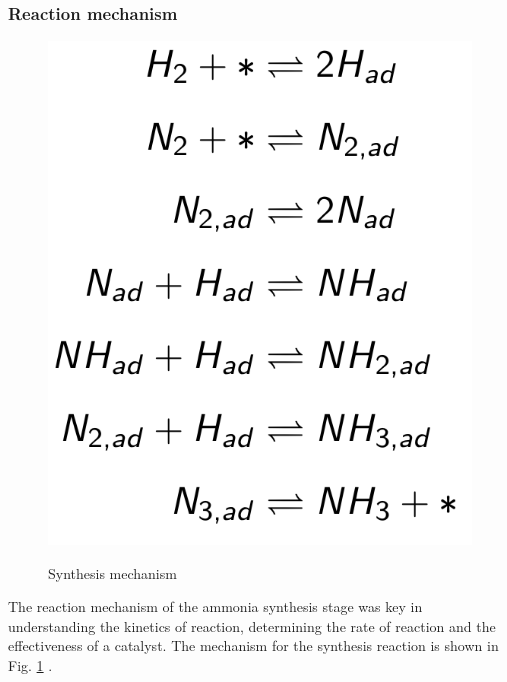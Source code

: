 \documentclass[11pt, a4paper]{article}
\begin{document}
{\subsubsection{Reaction mechanism}
\begin{figure}
	{\centering	
		\label{fig:mech}
		\includegraphics[width=1\textwidth]{mech}
		\caption{Synthesis mechanism}
	}
\end{figure}

The reaction mechanism of the ammonia synthesis stage was key in understanding the kinetics of reaction, determining the rate of reaction and the effectiveness of a catalyst. The mechanism for the synthesis reaction is shown in Fig. \ref{fig:mech} \cite{Jennings1991}.

}
\end{document}
